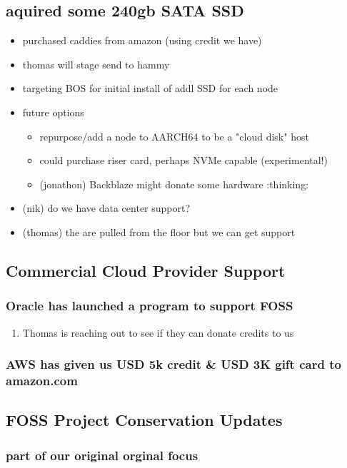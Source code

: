 \documentclass[11pt]{article}
\begin{document}
\subsection{aquired some 240gb SATA SSD}
\label{sec:orgc1ec28e}
\begin{itemize}
\item purchased caddies from amazon (using credit we have)
\item thomas will stage send to hammy
\item targeting BOS for initial install of addl SSD for each node
\item future options
\begin{itemize}
\item repurpose/add a node to AARCH64 to be a "cloud disk" host
\item could purchase riser card, perhaps NVMe capable (experimental!)
\item (jonathon) Backblaze might donate some hardware :thinking:
\end{itemize}
\item (nik) do we have data center support?
\item (thomas) the are pulled from the floor but we can get support
\end{itemize}
\subsection{Commercial Cloud Provider Support}
\label{sec:org9c22d52}
\subsubsection{Oracle has launched a program to support FOSS}
\label{sec:org410ec91}
\begin{enumerate}
\item Thomas is reaching out to see if they can donate credits to us
\label{sec:orga20607e}
\end{enumerate}
\subsubsection{AWS has given us USD 5k credit \& USD 3K gift card to amazon.com}
\label{sec:org84a2573}
\subsection{FOSS Project Conservation Updates}
\label{sec:org63a597c}
\subsubsection{part of our original orginal focus}
\label{sec:org76f37c6}
\end{document}
